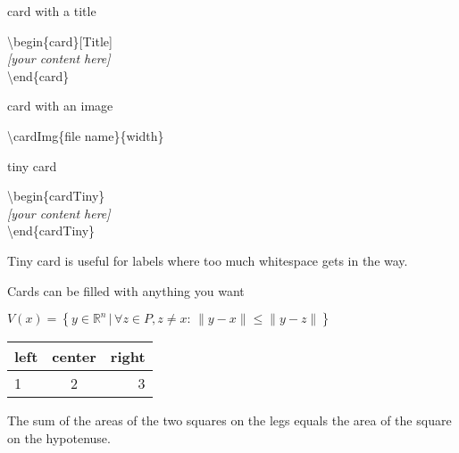 \documentclass[aspectratio=43]{beamer}
\begin{document}
\begin{frame}{card with a title}
\begin{card}[Title]
\end{card}

\begin{card}
{\color{primary} \textbackslash begin\{card\}[Title]\\[2mm]}
\null\qquad \textit{[your content here]}\\[2mm]
{\color{primary} \textbackslash end\{card\}}
\end{card}
\end{frame}

\begin{frame}{card with an image}
\centering
{}

\begin{card}
{\color{primary} \textbackslash cardImg\{file name\}\{width\}}
\end{card}
\end{frame}

\begin{frame}{tiny card}
\begin{cardTiny}
\end{cardTiny}

\begin{card}
{\color{primary} \textbackslash begin\{cardTiny\}\\[2mm]}
\null\qquad \textit{[your content here]}\\[2mm]
{\color{primary} \textbackslash end\{cardTiny\}}
\end{card}
\begin{card}
Tiny card is useful for labels where too much whitespace gets in the way. 
\end{card}
\end{frame}

\begin{frame}{Cards can be filled with anything you want}

\begin{card}
\centering$V(x) = \left\{ y \in \mathbb{R}^n \,|\, \forall z \in P, z\neq x:\, \|y-x\|\leq\|y-z\| \right\}$
\end{card}

\begin{card}
\centering
\begin{tabular}{lcr}
left & center & right \\
\hline
1 & 2 & 3 \\
\end{tabular}
\end{card}

\begin{card}
\begin{theorem}[Pythagorean]
The sum of the areas of the two squares on the legs equals the area of the square on the hypotenuse.
\end{theorem}
\end{card}
\end{frame}
\end{document}
